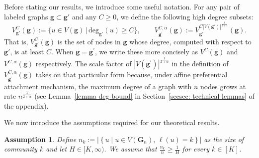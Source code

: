 \documentclass[twoside,11pt]{article}
\newtheorem{assumption}[theorem]{Assumption}
\theoremstyle{remark}
\begin{document}

Before stating our results, we introduce some useful notation. For any pair of labeled graphs $\boldsymbol{g} \subset \boldsymbol{g}'$ and any $C\geq0$, we define the following high degree subsets:
%
\begin{equation}
\label{define VC}
V^C_{\bm{g}'}(\bm{g}) := \{ u \in V(\bm{g}) \,|\, \mathrm{deg}_{\bm{g}'}(u) \geq C \},\qquad
    V^{C,\alpha}_{\boldsymbol{g}^\prime}(\boldsymbol{g}) := V_{\bm{g}'}^{C |V(\bm{g}')|^{\frac{1}{2+\alpha}}}(\bm{g}).
\end{equation}
That is, $V^C_{\bm{g}'}(\bm{g})$ is the set of nodes in $\bm{g}$ whose degree, computed with respect to $\bm{g}'$, is at least $C$. When $\boldsymbol{g} = \boldsymbol{g}^\prime$, we write these more concisely as $V^C(\bm{g})$ and $V^{C,\alpha}(\boldsymbol{g})$ respectively. 
The scale factor of $|V(\boldsymbol{g}^{\prime})|^{\frac{1}{2+\alpha}}$ in the definition of $V^{C,\alpha}_{\boldsymbol{g}^\prime}(\boldsymbol{g})$ takes on that particular form because, under affine preferential attachment mechanism, the maximum degree of a graph with $n$ nodes grows at rate $n^{\frac{1}{2+\alpha}}$ (see Lemma~\ref{lemma deg bound} in Section~\ref{secsec: technical lemmas} of the appendix).


We now introduce the assumptions required for our theoretical results.

\begin{assumption}
\label{assumption: bound}
Define $n_k:=\bigl| \left\{u \mid u\in V(\bm{G}_n),\, \ell(u)=k\right\}\bigr|$ as the size of community $k$ and let $H \in [K, \infty)$. We assume that $\frac{n_k}{n} \ge \frac{1}{H}$ for every $k \in [K]$. 
\end{assumption}
\end{document}
